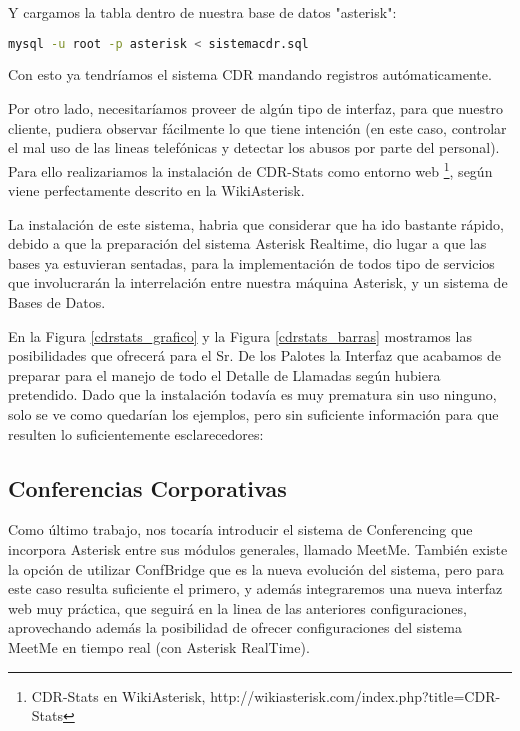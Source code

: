 Y cargamos la tabla dentro de nuestra base de datos "asterisk":

\begin{lstlisting}[language=sh]
mysql -u root -p asterisk < sistemacdr.sql
\end{lstlisting}

Con esto ya tendríamos el sistema CDR mandando registros autómaticamente.

Por otro lado, necesitaríamos proveer de algún tipo de interfaz, para que nuestro cliente, pudiera observar fácilmente lo que tiene intención (en este caso, controlar el mal uso de las lineas telefónicas y detectar los abusos por parte del personal). Para ello realizariamos la instalación de CDR-Stats como entorno web \footnote{CDR-Stats en WikiAsterisk, http://wikiasterisk.com/index.php?title=CDR-Stats}, según viene perfectamente descrito en la WikiAsterisk.

La instalación de este sistema, habria que considerar que ha ido bastante rápido, debido a que la preparación del sistema Asterisk Realtime, dio lugar a que las bases ya estuvieran sentadas, para la implementación de todos tipo de servicios que involucrarán la interrelación entre nuestra máquina Asterisk, y un sistema de Bases de Datos.

En la Figura \ref{cdrstats_grafico} y la Figura \ref{cdrstats_barras} mostramos las posibilidades que ofrecerá para el Sr. De los Palotes la Interfaz que acabamos de preparar para el manejo de todo el Detalle de Llamadas según hubiera pretendido. Dado que la instalación todavía es muy prematura sin uso ninguno, solo se ve como quedarían los ejemplos, pero sin suficiente información para que resulten lo suficientemente esclarecedores:



\subsection{Conferencias Corporativas}

Como último trabajo, nos tocaría introducir el sistema de Conferencing que incorpora Asterisk entre sus módulos generales, llamado MeetMe. También existe la opción de utilizar ConfBridge que es la nueva evolución del sistema, pero para este caso resulta suficiente el primero, y además integraremos una nueva interfaz web muy práctica, que seguirá en la linea de las anteriores configuraciones, aprovechando además la posibilidad de ofrecer configuraciones del sistema MeetMe en tiempo real (con Asterisk RealTime).


